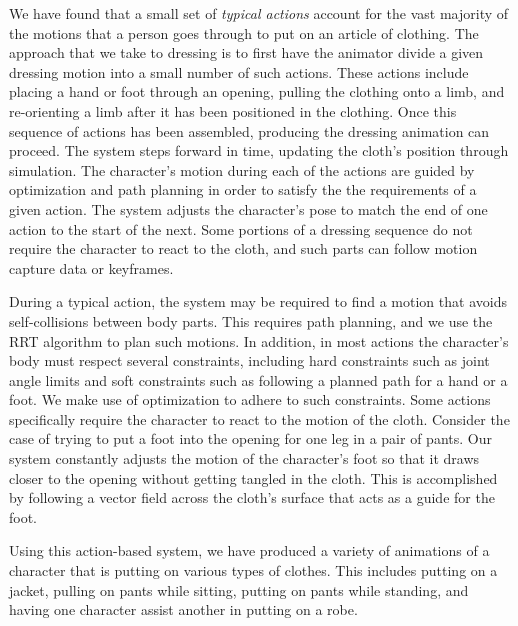 We have found that a small set of \emph{typical actions} account for the vast
majority of the motions that a person goes through to put on an article of
clothing.  The approach that we take to dressing is to first have the
animator divide a given dressing motion into a small number of such
actions.  These actions include placing a hand or foot through an opening,
pulling the clothing onto a limb, and re-orienting a limb after it has
been positioned in the clothing.  Once this sequence of actions has been
assembled, producing the dressing animation can proceed.  The system steps
forward in time, updating the cloth's position through simulation.  The
character's motion during each of the actions are guided by optimization
and path planning in order to satisfy the the requirements of a given
action.  The system adjusts the character's pose to match the end of one
action to the start of the next.  Some portions of a dressing sequence do
not require the character to react to the cloth, and such parts can follow
motion capture data or keyframes.

During a typical action, the system may be required to find a motion that
avoids self-collisions between body parts.  This requires path planning,
and we use the RRT algorithm to plan such motions.  In addition, in most
actions the character's body must respect several constraints, including
hard constraints such as joint angle limits and soft constraints such as
following a planned path for a hand or a foot.  We make use of
optimization to adhere to such constraints.  Some actions specifically
require the character to react to the motion of the cloth.  Consider the
case of trying to put a foot into the opening for one leg in a pair of
pants.  Our system constantly adjusts the motion of the character's foot
so that it draws closer to the opening without getting tangled in the
cloth.  This is accomplished by following a vector field across the
cloth's surface that acts as a guide for the foot.

Using this action-based system, we have produced a variety of animations
of a character that is putting on various types of clothes.  This includes
putting on a jacket, pulling on pants while sitting, putting on pants
while standing, and having one character assist another in putting on a
robe.


